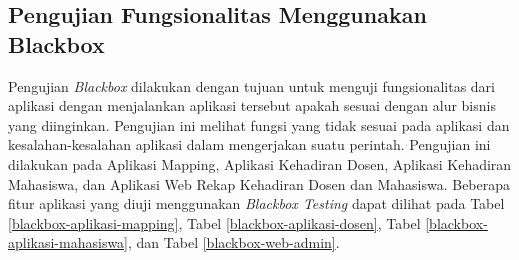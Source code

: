 \subsection{Pengujian Fungsionalitas Menggunakan Blackbox}
\par Pengujian \textit{Blackbox} dilakukan dengan tujuan untuk menguji fungsionalitas dari aplikasi dengan menjalankan aplikasi tersebut apakah sesuai dengan alur bisnis yang diinginkan. Pengujian ini melihat fungsi yang tidak sesuai pada aplikasi dan kesalahan-kesalahan aplikasi dalam mengerjakan suatu perintah. Pengujian ini dilakukan pada Aplikasi Mapping, Aplikasi Kehadiran Dosen, Aplikasi Kehadiran Mahasiswa, dan Aplikasi Web Rekap Kehadiran Dosen dan Mahasiswa. Beberapa fitur aplikasi yang diuji menggunakan \textit{Blackbox Testing} dapat dilihat pada Tabel \ref{blackbox-aplikasi-mapping}, Tabel \ref{blackbox-aplikasi-dosen}, Tabel \ref{blackbox-aplikasi-mahasiswa}, dan Tabel \ref{blackbox-web-admin}.
